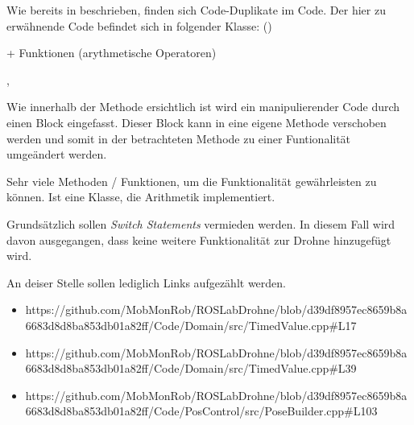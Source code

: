 







Wie bereits in  beschrieben, finden sich Code-Duplikate im Code.
Der hier zu erwähnende Code befindet sich in folgender Klasse:
 ()

+ Funktionen (arythmetische Operatoren)



, 

Wie innerhalb der Methode ersichtlich ist wird ein manipulierender Code durch einen Block eingefasst. Dieser Block kann in eine eigene Methode verschoben werden und somit in der betrachteten Methode zu einer Funtionalität umgeändert werden.






Sehr viele Methoden / Funktionen, um die Funktionalität gewährleisten zu können. Ist eine Klasse, die Arithmetik implementiert. 







Grundsätzlich sollen \textit{Switch Statements} vermieden werden.
In diesem Fall wird davon ausgegangen, dass keine weitere Funktionalität zur Drohne hinzugefügt wird.



An deiser Stelle sollen lediglich Links aufgezählt werden.

\begin{itemize}
\item https://github.com/MobMonRob/ROSLabDrohne/blob/d39df8957ec8659b8a6683d8d8ba853db01a82ff/Code/Domain/src/TimedValue.cpp\#L17
\item https://github.com/MobMonRob/ROSLabDrohne/blob/d39df8957ec8659b8a6683d8d8ba853db01a82ff/Code/Domain/src/TimedValue.cpp\#L39




\item https://github.com/MobMonRob/ROSLabDrohne/blob/d39df8957ec8659b8a6683d8d8ba853db01a82ff/Code/PosControl/src/PoseBuilder.cpp\#L103

\end{itemize}



